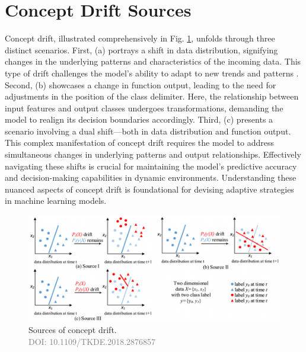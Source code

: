 \section{Concept Drift Sources}
\label{sec:background_concept_drift_sources}
Concept drift, illustrated comprehensively in Fig. \ref{fig:concept-drift-sources}, unfolds through three distinct scenarios. First, (a) portrays a shift in data distribution, signifying changes in the underlying patterns and characteristics of the incoming data. This type of drift challenges the model's ability to adapt to new trends and patterns \cite{lu2016concept, gama2014survey, losing2016knn, storkey2008training}.
Second, (b) showcases a change in function output, leading to the need for adjustments in the position of the class delimiter. Here, the relationship between input features and output classes undergoes transformations, demanding the model to realign its decision boundaries accordingly.
 Third, (c) presents a scenario involving a dual shift—both in data distribution and function output. This complex manifestation of concept drift requires the model to address simultaneous changes in underlying patterns and output relationships. Effectively navigating these shifts is crucial for maintaining the model's predictive accuracy and decision-making capabilities in dynamic environments. Understanding these nuanced aspects of concept drift is foundational for devising adaptive strategies in machine learning models.
 
\begin{figure}[!ht]
    \centering
    \includegraphics[width=1.0\textwidth]{2_Background/figures/concept_drift_sources.png}
    \caption{Sources of concept drift. \\ \textcolor{gray}{\fontsize{10}{0}\selectfont DOI: 10.1109/TKDE.2018.2876857}}
    \label{fig:concept-drift-sources}
\end{figure}

